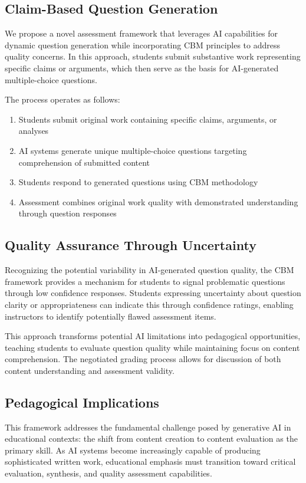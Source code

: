 \documentclass[sigconf]{acmart}
\begin{document}
\subsection{Claim-Based Question Generation}

We propose a novel assessment framework that leverages AI capabilities for dynamic question generation while incorporating CBM principles to address quality concerns. In this approach, students submit substantive work representing specific claims or arguments, which then serve as the basis for AI-generated multiple-choice questions.

The process operates as follows:
\begin{enumerate}
\item Students submit original work containing specific claims, arguments, or analyses
\item AI systems generate unique multiple-choice questions targeting comprehension of submitted content
\item Students respond to generated questions using CBM methodology
\item Assessment combines original work quality with demonstrated understanding through question responses
\end{enumerate}

\subsection{Quality Assurance Through Uncertainty}

Recognizing the potential variability in AI-generated question quality, the CBM framework provides a mechanism for students to signal problematic questions through low confidence responses. Students expressing uncertainty about question clarity or appropriateness can indicate this through confidence ratings, enabling instructors to identify potentially flawed assessment items.

This approach transforms potential AI limitations into pedagogical opportunities, teaching students to evaluate question quality while maintaining focus on content comprehension. The negotiated grading process allows for discussion of both content understanding and assessment validity.

\subsection{Pedagogical Implications}

This framework addresses the fundamental challenge posed by generative AI in educational contexts: the shift from content creation to content evaluation as the primary skill. As AI systems become increasingly capable of producing sophisticated written work, educational emphasis must transition toward critical evaluation, synthesis, and quality assessment capabilities.
\end{document}
